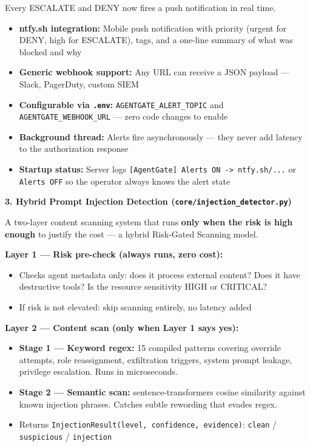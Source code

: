 \documentclass[12pt, a4paper]{article}
\begin{document}
Every ESCALATE and DENY now fires a push notification in real time.
\begin{itemize}[noitemsep]
  \item \textbf{ntfy.sh integration:} Mobile push notification with priority (urgent for DENY, high for ESCALATE), tags, and a one-line summary of what was blocked and why
  \item \textbf{Generic webhook support:} Any URL can receive a JSON payload — Slack, PagerDuty, custom SIEM
  \item \textbf{Configurable via \texttt{.env}:} \texttt{AGENTGATE\_ALERT\_TOPIC} and \texttt{AGENTGATE\_WEBHOOK\_URL} — zero code changes to enable
  \item \textbf{Background thread:} Alerts fire asynchronously — they never add latency to the authorization response
  \item \textbf{Startup status:} Server logs \texttt{[AgentGate] Alerts ON -> ntfy.sh/...} or \texttt{Alerts OFF} so the operator always knows the alert state
\end{itemize}

\textbf{3. Hybrid Prompt Injection Detection (\texttt{core/injection\_detector.py})}

A two-layer content scanning system that runs \textbf{only when the risk is high enough}
to justify the cost — a hybrid Risk-Gated Scanning model.

\textbf{Layer 1 — Risk pre-check (always runs, zero cost):}
\begin{itemize}[noitemsep]
  \item Checks agent metadata only: does it process external content? Does it have destructive tools? Is the resource sensitivity HIGH or CRITICAL?
  \item If risk is not elevated: skip scanning entirely, no latency added
\end{itemize}

\textbf{Layer 2 — Content scan (only when Layer 1 says yes):}
\begin{itemize}[noitemsep]
  \item \textbf{Stage 1 — Keyword regex:} 15 compiled patterns covering override attempts, role reassignment, exfiltration triggers, system prompt leakage, privilege escalation. Runs in microseconds.
  \item \textbf{Stage 2 — Semantic scan:} sentence-transformers cosine similarity against known injection phrases. Catches subtle rewording that evades regex.
  \item Returns \texttt{InjectionResult(level, confidence, evidence)}: \texttt{clean} / \texttt{suspicious} / \texttt{injection}
\end{itemize}
\end{document}
